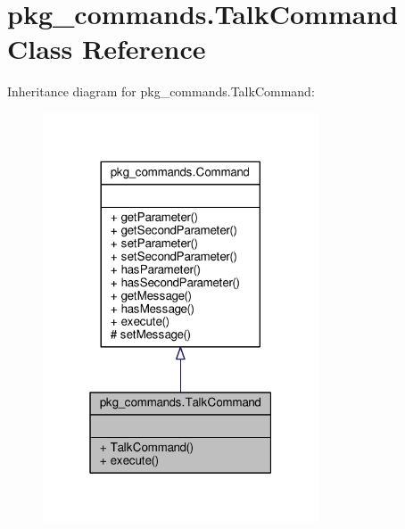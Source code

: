 \hypertarget{classpkg__commands_1_1TalkCommand}{\section{pkg\-\_\-commands.\-Talk\-Command Class Reference}
\label{classpkg__commands_1_1TalkCommand}
}


Inheritance diagram for pkg\-\_\-commands.\-Talk\-Command\-:
\nopagebreak
\begin{figure}[H]
\begin{center}
\leavevmode
\includegraphics[width=232pt]{classpkg__commands_1_1TalkCommand__inherit__graph}
\end{center}
\end{figure}


